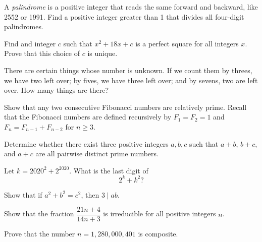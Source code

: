 \documentclass{article}
\begin{document}
    \begin{exercise}
        A \textit{palindrome} is a positive integer that reads the same forward and backward, like 2552 or 1991. 
        Find a positive integer greater than 1 that divides all four-digit palindromes.
    \end{exercise}

    \begin{exercise}
        Find and integer \(c\) such that \(x^2+18x+c\) is a perfect square for all integers \(x\). 
        Prove that this choice of \(c\) is unique. 
    \end{exercise}

    \begin{exercise}
        There are certain things whose number is unknown. 
        If we count them by threes, we have two left over; by fives, we have three left over; and by sevens, two are left over. 
        How many things are there?
    \end{exercise}

    \begin{exercise}
        Show that any two consecutive Fibonacci numbers are relatively prime. 
        Recall that the Fibonacci numbers are defined recursively by \(F_1=F_2=1\) and \(F_n=F_{n-1}+F_{n-2}\) for \(n\geq 3\).
    \end{exercise}

    \begin{exercise}
        Determine whether there exist three positive integers \(a,b,c\) such that \(a+b\), \(b+c\), and \(a+c\) are all pairwise distinct prime numbers.
    \end{exercise}

    \begin{exercise}
        Let \(k=2020^2+2^{2020}\).
        What is the last digit of
        \[2^k+k^2\mathord{?}\]
    \end{exercise}

    \begin{exercise}
        Show that if \(a^2+b^2=c^2\), then \(3\mid ab\).
    \end{exercise}

    \begin{exercise}
        Show that the fraction \(\dfrac{21n+4}{14n+3}\) is irreducible for all positive integers \(n\).
    \end{exercise}

    \begin{exercise}
        Prove that the number \(n=1,280,000,401\) is composite.
    \end{exercise}
\end{document}
